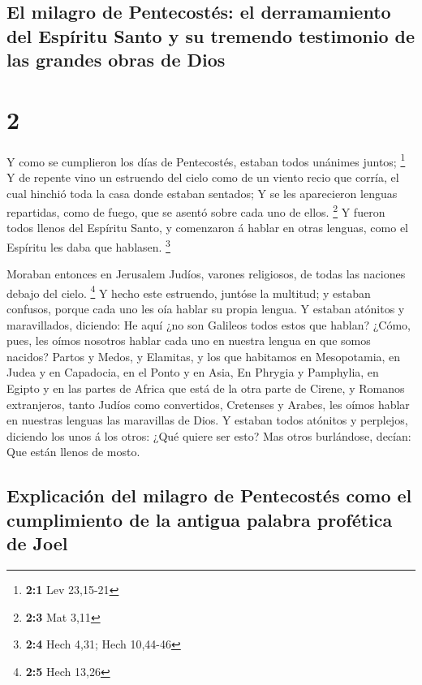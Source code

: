 \hypertarget{el-milagro-de-pentecostuxe9s-el-derramamiento-del-espuxedritu-santo-y-su-tremendo-testimonio-de-las-grandes-obras-de-dios}{%
\subsection{El milagro de Pentecostés: el derramamiento del Espíritu
Santo y su tremendo testimonio de las grandes obras de
Dios}\label{el-milagro-de-pentecostuxe9s-el-derramamiento-del-espuxedritu-santo-y-su-tremendo-testimonio-de-las-grandes-obras-de-dios}}

\hypertarget{section-1}{%
\section{2}\label{section-1}}

 Y como se cumplieron los días de Pentecostés, estaban todos
unánimes juntos; \footnote{\textbf{2:1} Lev 23,15-21}  Y de
repente vino un estruendo del cielo como de un viento recio que corría,
el cual hinchió toda la casa donde estaban sentados;  Y se
les aparecieron lenguas repartidas, como de fuego, que se asentó sobre
cada uno de ellos. \footnote{\textbf{2:3} Mat 3,11}  Y
fueron todos llenos del Espíritu Santo, y comenzaron á hablar en otras
lenguas, como el Espíritu les daba que hablasen. \footnote{\textbf{2:4}
  Hech 4,31; Hech 10,44-46}

 Moraban entonces en Jerusalem Judíos, varones religiosos,
de todas las naciones debajo del cielo. \footnote{\textbf{2:5} Hech
  13,26}  Y hecho este estruendo, juntóse la multitud; y
estaban confusos, porque cada uno les oía hablar su propia lengua.
 Y estaban atónitos y maravillados, diciendo: He aquí ¿no
son Galileos todos estos que hablan?  ¿Cómo, pues, les oímos
nosotros hablar cada uno en nuestra lengua en que somos nacidos?
 Partos y Medos, y Elamitas, y los que habitamos en
Mesopotamia, en Judea y en Capadocia, en el Ponto y en Asia,
 En Phrygia y Pamphylia, en Egipto y en las partes de
Africa que está de la otra parte de Cirene, y Romanos extranjeros, tanto
Judíos como convertidos,  Cretenses y Arabes, les oímos
hablar en nuestras lenguas las maravillas de Dios.  Y
estaban todos atónitos y perplejos, diciendo los unos á los otros: ¿Qué
quiere ser esto?  Mas otros burlándose, decían: Que están
llenos de mosto.

\hypertarget{explicaciuxf3n-del-milagro-de-pentecostuxe9s-como-el-cumplimiento-de-la-antigua-palabra-profuxe9tica-de-joel}{%
\subsection{Explicación del milagro de Pentecostés como el cumplimiento
de la antigua palabra profética de
Joel}\label{explicaciuxf3n-del-milagro-de-pentecostuxe9s-como-el-cumplimiento-de-la-antigua-palabra-profuxe9tica-de-joel}}

